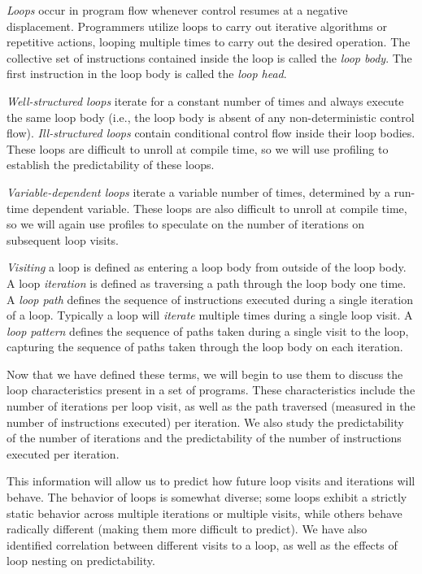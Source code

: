 \documentclass[times,10pt,twocolumn]{article}
\begin{document}
{\em Loops} occur in program flow whenever control resumes at a negative 
displacement.  Programmers utilize loops to carry out iterative algorithms or
repetitive actions, looping multiple times to carry out the desired operation.  
The collective set of instructions contained inside the loop is called 
the {\em loop body}.
The first instruction in the loop body is called the {\em loop head}.

{\em Well-structured loops} iterate for a constant number of times and
always execute the same loop body (i.e., the loop body is absent of
any non-deterministic control flow).
{\em Ill-structured loops} contain conditional control flow inside
their loop bodies.  These loops are difficult to unroll at compile time,
so we will use profiling to establish the predictability of these loops.

{\em Variable-dependent loops} iterate a variable number of times,
determined by a run-time dependent variable.  These loops are also
difficult to unroll at compile time, so we will again use profiles
to speculate on the number of iterations on subsequent loop visits.

{\em Visiting} a loop is defined as entering a loop body from outside
of the loop body.  A loop {\em iteration} is defined as traversing a path through
the loop body one time.  A {\em loop path} defines the sequence of 
instructions executed during a 
single iteration of a loop.  Typically a loop will {\em iterate} multiple times 
during a single loop visit.  A {\em loop pattern} defines
the sequence of paths taken during a single visit to the loop, capturing
the sequence of paths taken through the loop body on each iteration.

Now that we have defined these terms, we will begin to use them to 
discuss the loop characteristics present in a set of programs.
These characteristics include the number of iterations per loop visit, 
as well as the path traversed (measured in the number of instructions
executed) per iteration.  We 
also study the predictability of the number of iterations 
and the predictability of the number of instructions executed per iteration.

This information will allow us to predict how 
future loop visits and iterations
will behave. The behavior of loops is somewhat diverse;
some loops exhibit a strictly static behavior across multiple iterations or
multiple visits, while 
others behave radically different (making them more difficult to predict).
We have also identified correlation between different visits
to a loop, as well as the effects of loop nesting on predictability.
\end{document}
